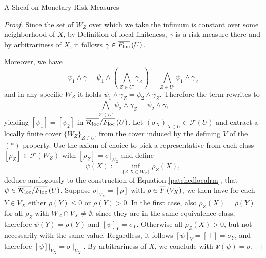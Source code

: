 \begin{subsection}{A Sheaf on Monetary Risk Measures}
\begin{proof}
        Since the set of \( W_Z \) over which we take the infimum is constant over some neighborhood of \( X \), by Definition
        of local finiteness, \( \gamma \) is a risk measure there and by arbitrariness of \( X \), it follows \( \gamma \in \overline{F_{\text{loc}}}\left (U \right) \).

        Moreover, we have 
        \[
            \psi_1 \wedge \gamma = \psi_1 \wedge \left (\bigwedge_{Z \in U'} \gamma_{Z} \right) = \bigwedge_{Z \in U'} \psi_1 \wedge \gamma_{Z}
        \]
        and in any specific \( W_Z \) it holds \( \psi_1 \wedge \gamma_Z = \psi_2 \wedge \gamma_Z \). Therefore the term rewrites to
        \[
            \bigwedge_{Z \in U'} \psi_2 \wedge \gamma_{Z} = \psi_2 \wedge \gamma,
        \]
        yielding \( [\psi_1] = [\psi_2] \) in \( \overline{\mathcal{R}_{\text{loc}}} / \overline{F_{\text{loc}}}\left (U \right) \).
        \newline
        \newline
        Let \( (\sigma_X)_{X \in U} \in \mathcal{F}(U) \) and extract a locally finite cover \( \{W_Z\}_{Z \in U'}\) from the cover induced by the defining \( V \)
        of the \( (\ast) \) property. 
        Use the axiom of choice to pick a representative from each class \( [\rho_Z] \in \mathcal{F}(W_Z) \) with \( [\rho_Z] = \sigma |_{W_Z} \) and define
        \[
            \psi(X) := \inf_{\{Z | X \in W_Z\}} \rho_Z(X),
        \]
        deduce analogously to the construction of Equation \ref{patchedlocalrm}, that \( \psi \in \overline{\mathcal{R}_{\text{loc}}} / \overline{F_{\text{loc}}}\left (U \right) \).
        Suppose \( \sigma|_{V_X} = [\rho] \) with \( \rho \in \overline{F}\left (V_X \right) \), we then have for each \( Y \in V_X \) either \( \rho(Y) \leq 0 \)
        or \( \rho(Y) > 0 \). In the first case, also \( \rho_Z(X) = \rho(Y) \) for all \( \rho_Z \) with \( W_Z \cap V_X \neq \emptyset \), 
        since they are in the same equivalence class, therefore \( \psi(Y) = \rho(Y) \) and \( [\psi]_{Y} = \sigma_Y \). Otherwise all \( \rho_Z(X) > 0 \),
        but not necessarily with the same value. Regardless, it follows \( [\psi]_{Y} = [\top] = \sigma_Y \), and therefore \( [\psi]|_{V_X} = \sigma \mid_{V_X} \).
        By arbitrariness of \( X \), we conclude with \( \Psi(\psi) = \sigma \).
    \end{proof}


\end{subsection}
